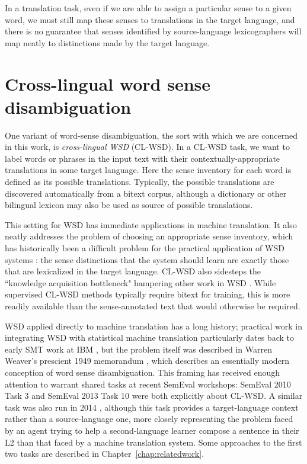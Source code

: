 In a translation task, even if we are able to assign a particular sense to a
given word, we must still map these senses to translations in the target
language, and there is no guarantee that senses identified by source-language
lexicographers will map neatly to distinctions made by the target language.




\section{Cross-lingual word sense disambiguation}
\label{sec:clwsd}

One variant of word-sense disambiguation, the sort with which we are concerned
in this work, is \emph{cross-lingual WSD} (CL-WSD).  In a CL-WSD task, we  want
to label words or phrases in the input text with their contextually-appropriate
translations in some target language.
Here the sense inventory for each word is defined as its possible
translations. Typically, the possible translations are discovered automatically
from a bitext corpus, although a dictionary or other bilingual lexicon may also
be used as source of possible translations.

This setting for WSD has immediate applications in machine translation. It
also neatly addresses the problem of choosing an appropriate sense inventory,
which has historically been a difficult problem for the practical application
of WSD systems \cite{agirre2006word}: the sense distinctions that the system
should learn are exactly those that are lexicalized in the target language.
CL-WSD also sidesteps the ``knowledge acquisition bottleneck" hampering other
work in WSD \cite{lefever-hoste-decock:2011:ACL-HLT2011}.
While supervised CL-WSD methods typically require bitext for training, this is
more readily available than the sense-annotated text that would otherwise be
required.

WSD applied directly to machine translation has a long history; practical work
in integrating WSD with statistical machine translation particularly dates back
to early SMT work at IBM \cite{Brown91word-sensedisambiguation}, but the
problem itself was described in Warren Weaver's prescient 1949 memorandum
\cite{weavermemo}, which describes an essentially modern conception of word
sense disambiguation.
This framing has received enough attention to warrant shared tasks at recent
SemEval workshops: SemEval 2010 Task 3 \cite{lefever-hoste:2009:SEW}
and SemEval 2013 Task 10 \cite{task10} were both explicitly about CL-WSD.
A similar task was also run in 2014 \cite{vangompel-EtAl:2014:SemEval},
although this task provides a target-language context rather than a
source-language one, more closely representing the problem faced by an agent
trying to help a second-language learner compose a sentence in their L2 than
that faced by a machine translation system. Some approaches to the first two
tasks are described in Chapter~\ref{chap:relatedwork}.


